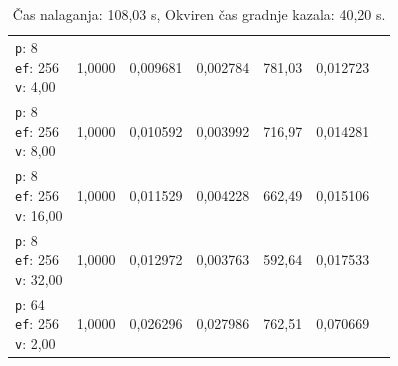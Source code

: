 \begin{table}[htbp]
\begin{tabularx}{\textwidth}{Xrrrrrr}
    \makecell{\texttt{p}: 8\\\texttt{ef}: 256\\\texttt{v}: 4,00} & 1,0000 & 0,009681 & 0,002784 & 781,03 & 0,012723 \\
    \makecell{\texttt{p}: 8\\\texttt{ef}: 256\\\texttt{v}: 8,00} & 1,0000 & 0,010592 & 0,003992 & 716,97 & 0,014281 \\
    \makecell{\texttt{p}: 8\\\texttt{ef}: 256\\\texttt{v}: 16,00} & 1,0000 & 0,011529 & 0,004228 & 662,49 & 0,015106 \\
    \makecell{\texttt{p}: 8\\\texttt{ef}: 256\\\texttt{v}: 32,00} & 1,0000 & 0,012972 & 0,003763 & 592,64 & 0,017533 \\
    \makecell{\texttt{p}: 64\\\texttt{ef}: 256\\\texttt{v}: 2,00} & 1,0000 & 0,026296 & 0,027986 & 762,51 & 0,070669 \\
    \bottomrule
  \end{tabularx}
\caption* {Čas nalaganja: 108,03 s, Okviren čas gradnje kazala: 40,20 s.}\end{table}

